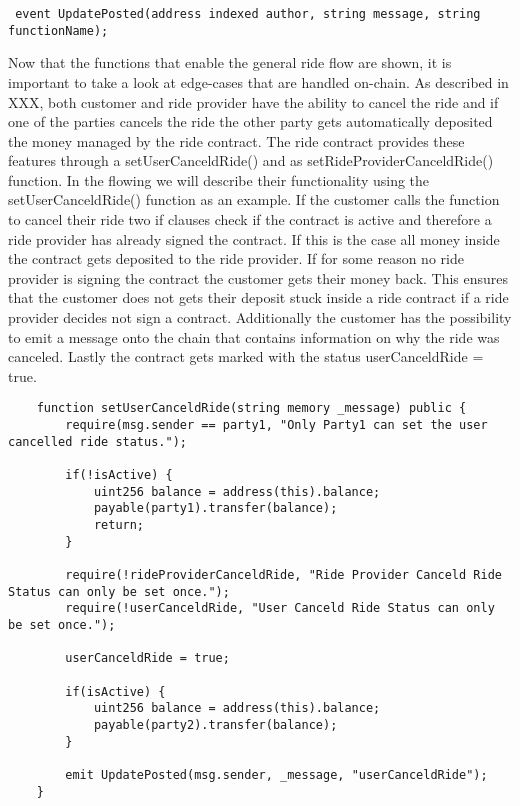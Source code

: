 \lstset{
  basicstyle=\footnotesize\ttfamily,
  breaklines=true,
  numbers=left,
  firstnumber=94
}
\begin{lstlisting}
 event UpdatePosted(address indexed author, string message, string functionName);
\end{lstlisting}

Now that the functions that enable the general ride flow are shown, it is important to take a look at edge-cases that are handled on-chain. As described in XXX, both customer and ride provider have the ability to cancel the ride and if one of the parties cancels the ride the other party gets automatically deposited the money managed by the ride contract. The ride contract provides these features through a setUserCanceldRide() and as setRideProviderCanceldRide() function. In the flowing we will describe their functionality using the setUserCanceldRide() function as an example. If the customer calls the function to cancel their ride two if clauses check if the contract is active and therefore a ride provider has already signed the contract. If this is the case all money inside the contract gets deposited to the ride provider. If for some reason no ride provider is signing the contract the customer gets their money back. This ensures that the customer does not gets their deposit stuck inside a ride contract if a ride provider decides not sign a contract. Additionally the customer has the possibility to emit a message onto the chain that contains information on why the ride was canceled.
Lastly the contract gets marked with the status userCanceldRide = true.

\lstset{
  basicstyle=\footnotesize\ttfamily,
  breaklines=true,
  numbers=left,
  firstnumber=176
}
\begin{lstlisting}
    function setUserCanceldRide(string memory _message) public {
        require(msg.sender == party1, "Only Party1 can set the user cancelled ride status.");
        
        if(!isActive) {
            uint256 balance = address(this).balance;
            payable(party1).transfer(balance);
            return;
        }

        require(!rideProviderCanceldRide, "Ride Provider Canceld Ride Status can only be set once.");
        require(!userCanceldRide, "User Canceld Ride Status can only be set once.");

        userCanceldRide = true;
        
        if(isActive) {
            uint256 balance = address(this).balance;
            payable(party2).transfer(balance);
        }
        
        emit UpdatePosted(msg.sender, _message, "userCanceldRide");
    }
\end{lstlisting}

